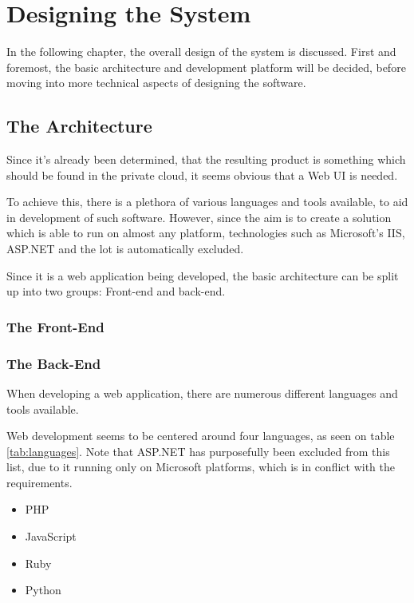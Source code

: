 \chapter{Designing the System}
	In the following chapter, the overall design of the system is discussed. First and foremost, the basic architecture and development platform will be decided, before moving into more technical aspects of designing the software.


	\section{The Architecture}
		Since it's already been determined, that the resulting product is something which should be found in the private cloud, it seems obvious that a Web UI is needed.

		To achieve this, there is a plethora of various languages and tools available, to aid in development of such software. However, since the aim is to create a solution which is able to run on almost any platform, technologies such as Microsoft's IIS, ASP.NET and the lot is automatically excluded.



		Since it is a web application being developed, the basic architecture can be split up into two groups: Front-end and back-end.

		\subsection{The Front-End}


		\subsection{The Back-End}
			When developing a web application, there are numerous different languages and tools available. 


			Web development seems to be centered around four languages, as seen on table \ref{tab:languages}. Note that ASP.NET has purposefully been excluded from this list, due to it running only on Microsoft platforms, which is in conflict with the requirements.
			
			\begin{table}
				\begin{itemize}
					\item PHP
					\item JavaScript
					\item Ruby
					\item Python
				\end{itemize}
				\label{tab:languages}
			\end{table}


